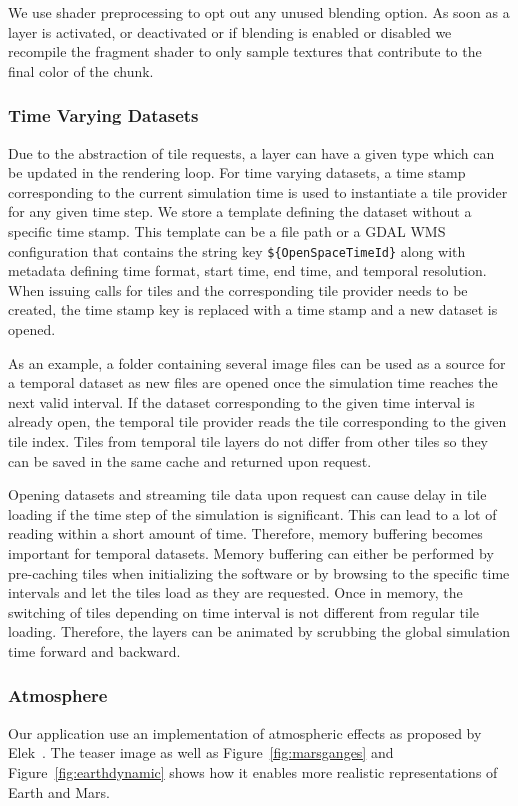 \documentclass[journal]{vgtc}                %
\newcommand{\fig}[1]{Figure~\ref{fig:#1}}
\begin{document}
\fi

We use shader preprocessing to opt out any unused blending option.
As soon as a layer is activated, or deactivated or if blending is enabled or disabled we recompile the fragment shader to only sample textures that contribute to the final color of the chunk.

\subsubsection{Time Varying Datasets}
Due to the abstraction of tile requests, a layer can have a given type which can be updated in the rendering loop. For time varying datasets, a time stamp corresponding to the current simulation time is used to instantiate a tile provider for any given time step.
We store a template defining the dataset without a specific time stamp. This template can be a file path or a GDAL WMS configuration that contains the string key \texttt{\$\{OpenSpaceTimeId\}} along with metadata defining time format, start time, end time, and temporal resolution. When issuing calls for tiles and the corresponding tile provider needs to be created, the time stamp key is replaced with a time stamp and a new dataset is opened.

As an example, a folder containing several image files can be used as a source for a temporal dataset as new files are opened once the simulation time reaches the next valid interval. If the dataset corresponding to the given time interval is already open, the temporal tile provider reads the tile corresponding to the given tile index.
Tiles from temporal tile layers do not differ from other tiles so they can be saved in the same cache and returned upon request.

Opening datasets and streaming tile data upon request can cause delay in tile loading if the time step of the simulation is significant. This can lead to a lot of reading within a short amount of time. Therefore, memory buffering becomes important for temporal datasets. Memory buffering can either be performed by pre-caching tiles when initializing the software or by browsing to the specific time intervals and let the tiles load as they are requested. Once in memory, the switching of tiles depending on time interval is not different from regular tile loading. Therefore, the layers can be animated by scrubbing the global simulation time forward and backward.

\subsubsection{Atmosphere}
Our application use an implementation of atmospheric effects as proposed by Elek~\cite{elek2009rendering}. The teaser image as well as \fig{marsganges} and \fig{earthdynamic} shows how it enables more realistic representations of Earth and Mars.
\end{document}
